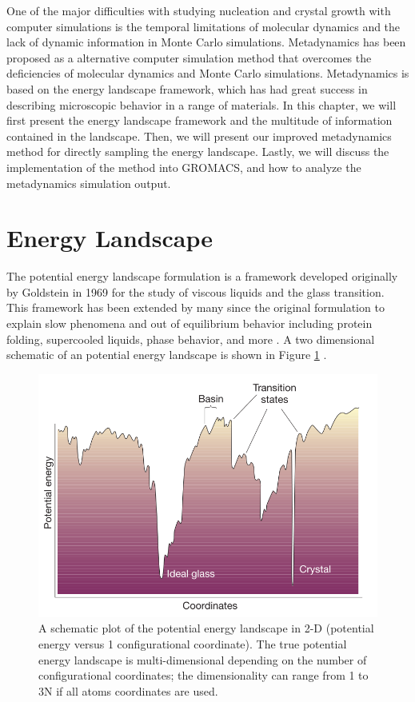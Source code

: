 One of the major difficulties with studying nucleation and crystal growth with computer simulations is the temporal limitations of molecular dynamics and the lack of dynamic information in Monte Carlo simulations. Metadynamics has been proposed as a alternative computer simulation method that overcomes the deficiencies of molecular dynamics and Monte Carlo simulations.  Metadynamics is based on the energy landscape framework, which has had great success in describing microscopic behavior in a range of materials.  In this chapter, we will first present the energy landscape framework and the multitude of information contained in the landscape.  Then, we will present our improved metadynamics method for directly sampling the energy landscape.  Lastly, we will discuss the implementation of the method into GROMACS, and how to analyze the metadynamics simulation output.

\section{Energy Landscape}
The potential energy landscape formulation is a framework developed originally by Goldstein in 1969 \cite{Goldstein1969} for the study of viscous liquids and the glass transition.  This framework has been extended by many since the original formulation to explain slow phenomena and out of equilibrium behavior including protein folding, supercooled liquids, phase behavior, and more \cite{Shell2003}\cite{Middleton2001}\cite{Angell1997}\cite{Debenedetti2001}.  A two dimensional schematic of an potential energy landscape is shown in Figure \ref{energy_landscape} \cite{Debenedetti2001}.

\begin{figure}[h]
	\centering
	\includegraphics[width = .5\textwidth]{./Figures/MTD/Energy_landscape.png}
	\caption[A schematic plot of the potential energy landscape in 2-D (potential energy versus 1 configurational coordinate).  The true potential energy landscape is multi-dimensional depending on the number of configurational coordinates; the dimensionality can range from 1 to 3N if all atoms coordinates are used.]{A schematic plot of the potential energy landscape in 2-D (potential energy versus 1 configurational coordinate).  The true potential energy landscape is multi-dimensional depending on the number of configurational coordinates; the dimensionality can range from 1 to 3N if all atoms coordinates are used. \cite{Debenedetti2001}}
	\label{energy_landscape}
\end{figure}

